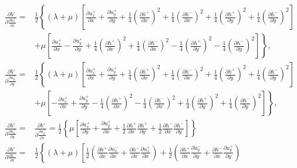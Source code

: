 \documentclass[aps,prx,10pt,twocolumn,superscriptaddress]{revtex4}
\begin{document}
\begin{widetext}
\begin{align}
\frac{\partial V}{\partial \frac{\partial u^{+}_{x}}{\partial x}}=&\frac{1}{2}\left\{(\lambda+\mu)\left[ \frac{\partial u^{+}_{x}}{\partial x}+\frac{\partial u^{+}_{y}}{\partial y}+\frac{1}{4}\left(\frac{\partial h^{+}}{\partial x}\right)^{2}+\frac{1}{4}\left(\frac{\partial h^{-}}{\partial x}\right)^{2}+\frac{1}{4}\left(\frac{\partial h^{+}}{\partial y}\right)^{2}+\frac{1}{4}\left(\frac{\partial h^{-}}{\partial y}\right)^{2}\right]\right.\nonumber\\
&\left.+\mu\left[\frac{\partial u^{+}_{x}}{\partial x}-\frac{\partial u^{+}_{y}}{\partial y}+\frac{1}{4}\left(\frac{\partial h^{+}}{\partial x}\right)^{2}+\frac{1}{4}\left(\frac{\partial h^{-}}{\partial x}\right)^{2}-\frac{1}{4}\left(\frac{\partial h^{+}}{\partial y}\right)^{2}-\frac{1}{4}\left(\frac{\partial h^{-}}{\partial y}\right)^{2}\right]\right\},\nonumber\\
\frac{\partial V}{\partial \frac{\partial u^{+}_{y}}{\partial y}}=&\frac{1}{2}\left\{(\lambda+\mu)\left[ \frac{\partial u^{+}_{x}}{\partial x}+\frac{\partial u^{+}_{y}}{\partial y}+\frac{1}{4}\left(\frac{\partial h^{+}}{\partial x}\right)^{2}+\frac{1}{4}\left(\frac{\partial h^{-}}{\partial x}\right)^{2}+\frac{1}{4}\left(\frac{\partial h^{+}}{\partial y}\right)^{2}+\frac{1}{4}\left(\frac{\partial h^{-}}{\partial y}\right)^{2}\right]\right.\nonumber\\
&\left.+\mu\left[-\frac{\partial u^{+}_{x}}{\partial x}+\frac{\partial u^{+}_{y}}{\partial y}-\frac{1}{4}\left(\frac{\partial h^{+}}{\partial x}\right)^{2}-\frac{1}{4}\left(\frac{\partial h^{-}}{\partial x}\right)^{2}+\frac{1}{4}\left(\frac{\partial h^{+}}{\partial y}\right)^{2}+\frac{1}{4}\left(\frac{\partial h^{-}}{\partial y}\right)^{2}\right]\right\},\nonumber\\
\frac{\partial V}{\partial \frac{\partial u^{+}_{x}}{\partial y}}=&\frac{\partial V}{\partial \frac{\partial u^{+}_{y}}{\partial x}}=\frac{1}{2}\left\{\mu\left[ \frac{\partial u^{+}_{x}}{\partial y}+\frac{\partial u^{+}_{y}}{\partial x} + \frac{1}{2}\frac{\partial h^{+}}{\partial x}\frac{\partial h^{+}}{\partial y}+\frac{1}{2}\frac{\partial h^{-}}{\partial x}\frac{\partial h^{-}}{\partial y}\right]\right\}\nonumber\\
\frac{\partial V}{\partial \frac{\partial h^{-}}{\partial x}}=&\frac{1}{2}\left\{ (\lambda+\mu)\left[ \frac{1}{2}\left( \frac{\partial h^{+}}{\partial x}\frac{\partial u^{-}_{x}}{\partial x}+\frac{\partial h^{-}}{\partial x}\frac{\partial u^{+}_{x}}{\partial x} \right) +\frac{1}{2}\left( \frac{\partial h^{+}}{\partial x}\frac{\partial u^{-}_{y}}{\partial y}+\frac{\partial h^{-}}{\partial x}\frac{\partial u^{+}_{y}}{\partial y} \right)  \right. \right.\nonumber\\

\end{align}
\end{widetext}
\end{document}
